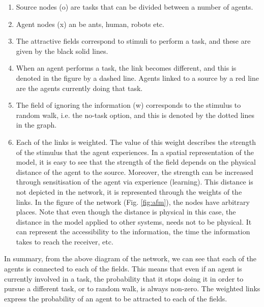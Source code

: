 \documentclass[preprint,12pt]{elsarticle}
\begin{document}
\begin{enumerate}
\item Source nodes (o) are tasks that can be divided between a number of agents.
\item Agent nodes (x) an be ants, human,  robots etc.
\item The attractive fields correspond to stimuli to perform a task, and these are given by the black solid lines.
\item When an agent performs a task, the link becomes different, and this is denoted in the figure by a dashed line. Agents linked to a source by a red line are the agents currently doing that task. 
\item The field of ignoring the information (w) corresponds to the stimulus to random walk, i.e. the no-task option, and this is denoted by the dotted lines in the graph. 
\item Each of the links is weighted. The value of this weight describes the strength of the stimulus that the agent experiences. In a spatial representation of the model, it is easy to see that the strength of the field depends on the physical distance of the agent to the source. Moreover, the strength can be increased through sensitisation of the agent via experience (learning). This distance is not depicted in the network, it is represented through the weights of the links. In the figure of the network (Fig. \ref{fig:afm}), the nodes have arbitrary places. Note that even though the distance is physical in this case, the distance in the model applied to other systems, needs not to be physical. It can represent the accessibility to the information, the time the information takes to reach the receiver, etc. 
\end{enumerate}
In summary, from the above diagram of the network, we can see that each of the agents is connected to each of the fields. This means that even if an agent is currently involved in a task, the probability that it stops doing it in order to pursue a different task, or to random walk, is always non-zero. The weighted links express the probability of an agent to be attracted to each of the fields.
\end{document}
